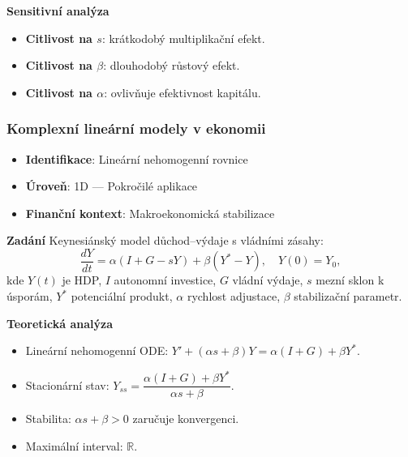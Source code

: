 \begin{example}
\noindent\textbf{Sensitivní analýza}
\begin{itemize}
\item \textbf{Citlivost na $s$}: krátkodobý multiplikační efekt.
\item \textbf{Citlivost na $\beta$}: dlouhodobý růstový efekt.
\item \textbf{Citlivost na $\alpha$}: ovlivňuje efektivnost kapitálu.
\end{itemize}
\end{example}

\subsubsection{Komplexní lineární modely v ekonomii}
\label{subsec:komplexni-linearne}

\begin{example}
\label{ex:keynesian-model}

\begin{itemize}
\item \textbf{Identifikace}: Lineární nehomogenní rovnice
\item \textbf{Úroveň}: 1D — Pokročilé aplikace
\item \textbf{Finanční kontext}: Makroekonomická stabilizace
\end{itemize}

\noindent\textbf{Zadání}
Keynesiánský model důchod–výdaje s vládními zásahy:
\[
\frac{dY}{dt} = \alpha(I + G - sY) + \beta(Y^* - Y), \quad Y(0) = Y_0,
\]
kde $Y(t)$ je HDP, $I$ autonomní investice, $G$ vládní výdaje, $s$ mezní sklon k úsporám, $Y^*$ potenciální produkt, $\alpha$ rychlost adjustace, $\beta$ stabilizační parametr.

\noindent\textbf{Teoretická analýza}
\begin{itemize}
\item Lineární nehomogenní ODE: $Y' + (\alpha s + \beta)Y = \alpha(I + G) + \beta Y^*$.
\item Stacionární stav: $Y_{ss} = \dfrac{\alpha(I + G) + \beta Y^*}{\alpha s + \beta}$.
\item Stabilita: $\alpha s + \beta > 0$ zaručuje konvergenci.
\item Maximální interval: $\mathbb{R}$.
\end{itemize}


\end{example}
